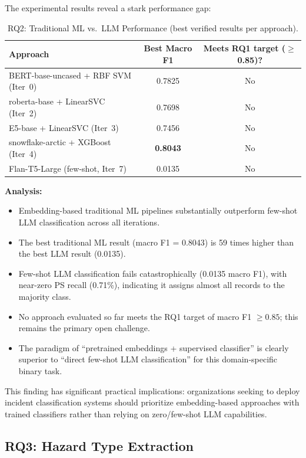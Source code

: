 \documentclass[11pt, titlepage, bibliography=totoc]{scrreprt}
\begin{document}
The experimental results reveal a stark performance gap:

\begin{table}[htbp]
\centering
\caption{RQ2: Traditional ML vs.\ LLM Performance (best verified results per approach).}
\begin{tabular}{@{}lcc@{}}
\toprule
\textbf{Approach} & \textbf{Best Macro F1} & \textbf{Meets RQ1 target ($\geq$0.85)?} \\
\midrule
BERT-base-uncased + RBF SVM (Iter~0)           & 0.7825 & No \\
roberta-base + LinearSVC (Iter~2)              & 0.7698 & No \\
E5-base + LinearSVC (Iter~3)                   & 0.7456 & No \\
snowflake-arctic + XGBoost (Iter~4)            & \textbf{0.8043} & No \\
Flan-T5-Large (few-shot, Iter~7)               & 0.0135 & No \\
\bottomrule
\end{tabular}
\end{table}

\textbf{Analysis:}
\begin{itemize}
    \item Embedding-based traditional ML pipelines substantially outperform few-shot LLM classification across all iterations.
    \item The best traditional ML result (macro F1 = 0.8043) is 59 times higher than the best LLM result (0.0135).
    \item Few-shot LLM classification fails catastrophically (0.0135 macro F1), with near-zero PS recall (0.71\%), indicating it assigns almost all records to the majority class.
    \item No approach evaluated so far meets the RQ1 target of macro F1 $\geq 0.85$; this remains the primary open challenge.
    \item The paradigm of ``pretrained embeddings + supervised classifier'' is clearly superior to ``direct few-shot LLM classification'' for this domain-specific binary task.
\end{itemize}

This finding has significant practical implications: organizations seeking to deploy incident classification systems should prioritize embedding-based approaches with trained classifiers rather than relying on zero/few-shot LLM capabilities.

\subsection{RQ3: Hazard Type Extraction}
\end{document}
